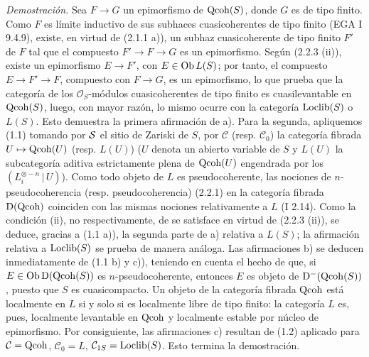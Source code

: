 \emph{Demostración.} Sea $F\to G$ un epimorfismo de $\Qcoh(S)$, donde $G$ es de tipo finito. Como $F$ es límite inductivo de sus subhaces cuasicoherentes de tipo finito (EGA I 9.4.9), existe, en virtud de (2.1.1 a)), un subhaz cuasicoherente de tipo finito $F'$ de $F$ tal que el compuesto $F'\to F\to G$ es un epimorfismo. Según (2.2.3 (ii)), existe un epimorfismo $E\to F'$, con $E\in\Ob L(S)$; por tanto, el compuesto $E\to F'\to F$, compuesto con $F\to G$, es un epimorfismo, lo que prueba que la categoría de los $\mathcal O_S$-módulos cuasicoherentes de tipo finito es cuasilevantable en $\Qcoh(S)$, luego, con mayor razón, lo mismo ocurre con la categoría $\Loclib(S)$ o $L(S)$. Esto demuestra la primera afirmación de a). Para la segunda, apliquemos (1.1) tomando por $\sisi{S}{\mathcal S}$ el sitio de Zariski de $S$, por $\mathcal C$ (resp. $\mathcal C_0$) la categoría fibrada $U\mapsto\Qcoh(U)$ (resp. $L(U)$) ($U$ denota un abierto variable de $S$ y $L(U)$ la subcategoría aditiva estrictamente plena de $\Qcoh(U)$ engendrada por los $(L_i^{\otimes-n}\,|\,U)$). Como todo objeto de $L$ es pseudocoherente, las nociones de $n$-pseudocoherencia (resp. pseudocoherencia) (2.2.1) en la categoría fibrada $\mathrm D(\Qcoh)$ coinciden con las mismas nociones relativamente a $L$ (I 2.14). Como la condición (ii), no respectivamente, de  se satisface en virtud de (2.2.3 (ii)), se deduce, gracias a (1.1 a)), la segunda parte de a) relativa a $L(S)$; la afirmación relativa a $\Loclib(S)$ se prueba de manera análoga. Las afirmaciones b) se deducen inmediatamente de (1.1 b) y c)), teniendo en cuenta el hecho de que, si $E\in\Ob\mathrm D(\Qcoh(S))$ es $n$-pseudocoherente, entonces $E$ es objeto de $\mathrm D^{-}(\Qcoh(S))$, puesto que $S$ es cuasicompacto. Un objeto de la categoría fibrada $\Qcoh$ está localmente en $L$ si y solo si es localmente libre de tipo finito: la categoría $L$ es, pues, localmente levantable en $\Qcoh$ y localmente estable por núcleo de epimorfismo. Por consiguiente, las afirmaciones c) resultan de (1.2) aplicado para $\mathcal C=\Qcoh$, $\mathcal C_0=L$, $\mathcal C_{1S}=\Loclib(S)$. Esto termina la demostración.

